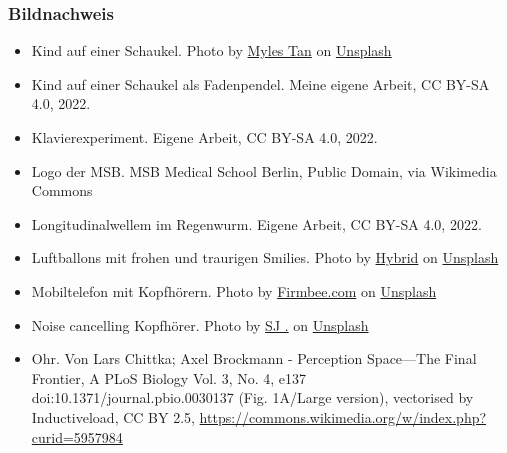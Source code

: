 \documentclass{beamer}
\begin{document}
\begin{frame}
\frametitle{Bildnachweis}

\begin{tiny}

\begin{itemize}


\item
Kind auf einer Schaukel. Photo by \href{https://unsplash.com/@mylestan?utm_source=unsplash&utm_medium=referral&utm_content=creditCopyText}{Myles Tan} on \href{https://unsplash.com/s/photos/swing?utm_source=unsplash&utm_medium=referral&utm_content=creditCopyText }{Unsplash}
  
\item
Kind auf einer Schaukel als Fadenpendel. Meine eigene Arbeit, CC BY-SA 4.0, 2022. 

\item
Klavierexperiment. Eigene Arbeit, CC BY-SA 4.0, 2022.

  

\item
Logo der MSB. MSB Medical School Berlin, Public Domain, via Wikimedia Commons

\item
Longitudinalwellem im Regenwurm. Eigene Arbeit, CC BY-SA 4.0, 2022.

\item
Luftballons mit frohen und traurigen Smilies. Photo by \href{https://unsplash.com/@artbyhybrid?utm_source=unsplash&utm_medium=referral&utm_content=creditCopyText}{Hybrid} on \href{https://unsplash.com/s/photos/feedback?utm_source=unsplash&utm_medium=referral&utm_content=creditCopyText}{Unsplash}

\item
Mobiltelefon mit Kopfhörern. Photo by \href{https://unsplash.com/@firmbee?utm_source=unsplash&utm_medium=referral&utm_content=creditCopyText}{Firmbee.com} on \href{https://unsplash.com/s/photos/mp3?utm_source=unsplash&utm_medium=referral&utm_content=creditCopyText}{Unsplash}
  

\item
Noise cancelling Kopfhörer. Photo by \href{https://unsplash.com/@sjcbrn?utm_source=unsplash&utm_medium=referral&utm_content=creditCopyText}{SJ .} on \href{https://unsplash.com/s/photos/noise-cancelling-headphones?utm_source=unsplash&utm_medium=referral&utm_content=creditCopyText}{Unsplash}  

\item
Ohr. Von Lars Chittka; Axel Brockmann - Perception Space—The Final Frontier, A PLoS Biology Vol. 3, No. 4, e137 doi:10.1371/journal.pbio.0030137 (Fig. 1A/Large version), vectorised by Inductiveload, CC BY 2.5, \url{https://commons.wikimedia.org/w/index.php?curid=5957984}


\end{itemize}
\end{tiny}
\end{frame}
\end{document}

